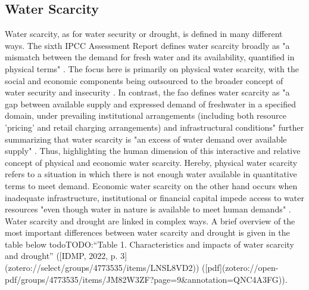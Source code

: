 \subsection{Water Scarcity}\label{subsec:water_scarcity}

Water scarcity, as for water security or drought, is defined in many different ways. The sixth IPCC Assessment Report defines water scarcity broadly as "a mismatch between the demand for fresh water and its availability, quantified in physical terms" \autocite[560]{caretta2022water}. The focus here is primarily on physical water scarcity, with the social and economic components being outsourced to the broader concept of water security and insecurity \autocite{caretta2022water}. In contrast, the \acrfull{fao} defines water scarcity as "a gap between available supply and expressed demand of freshwater in a specified domain, under prevailing institutional arrangements (including both resource 'pricing' and retail charging arrangements) and infrastructural conditions" \autocite[5]{faoCopingWaterScarcity2012} further summarizing that water scarcity is "an excess of water demand over available supply" \autocite[6]{faoCopingWaterScarcity2012}. Thus, highlighting the human dimension of this interactive and relative concept of physical and economic water scarcity. Hereby, physical water scarcity refers to a situation in which there is not enough water available in quantitative terms to meet demand. Economic water scarcity on the other hand occurs when inadequate infrastructure, institutional or financial capital impede access to water resources "even though water in nature is available to meet human demands" \autocites{idmpDroughtWaterScarcity2022}[11]{moldenWaterFoodWater2007}.\newline
Water scarcity and drought are linked in complex ways. A brief overview of the most important differences between water scarcity and drought is given in the table below todo{TODO:“Table 1. Characteristics and impacts of water scarcity and drought” ([IDMP, 2022, p. 3](zotero://select/groups/4773535/items/LNSL8VD2)) ([pdf](zotero://open-pdf/groups/4773535/items/JM82W3ZF?page=9&annotation=QNC4A3FG))}. 


